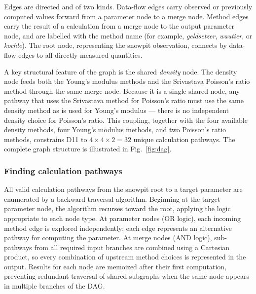 \documentclass[hess, manuscript]{copernicus}
\begin{document}
Edges are directed and of two kinds. Data-flow edges carry observed or previously computed values forward from a parameter node to a merge node. Method edges carry the result of a calculation from a merge node to the output parameter node, and are labelled with the method name (for example, \textit{geldsetzer}, \textit{wautier}, or \textit{kochle}). The root node, representing the snowpit observation, connects by data-flow edges to all directly measured quantities.

A key structural feature of the graph is the shared \textit{density} node. The density node feeds both the Young's modulus methods and the Srivastava Poisson's ratio method through the same merge node. Because it is a single shared node, any pathway that uses the Srivastava method for Poisson's ratio must use the same density method as is used for Young's modulus --- there is no independent density choice for Poisson's ratio. This coupling, together with the four available density methods, four Young's modulus methods, and two Poisson's ratio methods, constrains D11 to $4 \times 4 \times 2 = 32$ unique calculation pathways. The complete graph structure is illustrated in Fig.~\ref{fig:dag}.

\subsubsection{Finding calculation pathways}



All valid calculation pathways from the snowpit root to a target parameter are enumerated by a backward traversal algorithm. Beginning at the target parameter node, the algorithm recurses toward the root, applying the logic appropriate to each node type. At parameter nodes (OR logic), each incoming method edge is explored independently; each edge represents an alternative pathway for computing the parameter. At merge nodes (AND logic), sub-pathways from all required input branches are combined using a Cartesian product, so every combination of upstream method choices is represented in the output. Results for each node are memoized after their first computation, preventing redundant traversal of shared subgraphs when the same node appears in multiple branches of the DAG.
\end{document}
